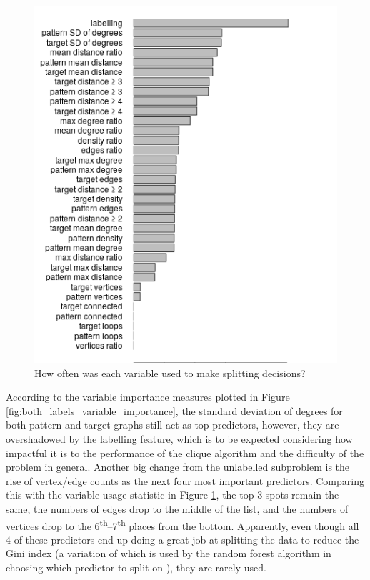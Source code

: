 \documentclass{l4proj}
\theoremstyle{definition}
\theoremstyle{remark}
\begin{document}
\begin{figure}
  \centering
  \includegraphics{images/both_labels_var_used.png}
  \caption{How often was each variable used to make splitting decisions?}
  \label{fig:both_labels_var_used}
\end{figure}

According to the variable importance measures plotted in Figure
\ref{fig:both_labels_variable_importance}, the standard deviation of degrees for
both pattern and target graphs still act as top predictors, however, they are
overshadowed by the labelling feature, which is to be expected considering how
impactful it is to the performance of the clique algorithm and the difficulty of
the problem in general. Another big change from the unlabelled subproblem is the
rise of vertex/edge counts as the next four most important predictors. Comparing
this with the variable usage statistic in Figure \ref{fig:both_labels_var_used},
the top 3 spots remain the same, the numbers of edges drop to the middle of the
list, and the numbers of vertices drop to the
6\textsuperscript{th}--7\textsuperscript{th} places from the bottom. Apparently,
even though all 4 of these predictors end up doing a great job at splitting the
data to reduce the Gini index (a variation of which is used by the random forest
algorithm in choosing which predictor to split on \cite{167153}), they are
rarely used.
\end{document}
